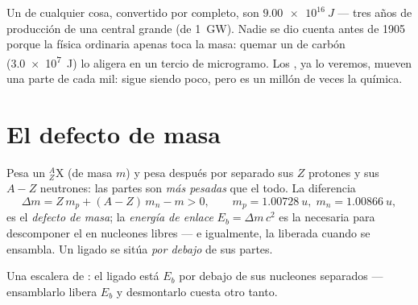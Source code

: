 \begin{example}\label{ex:g12:nuclear-energy:fortune}
Un  de cualquier cosa, convertido por completo, son $\qty{9.00e16}{J}$ ---
tres años de producción de una central grande (de \qty{1}{GW}). Nadie se dio cuenta
antes de 1905 porque la física ordinaria apenas toca la masa: quemar un  de
carbón (\qty{3.0e7}{J}) lo aligera en un tercio de microgramo. Los , ya lo
veremos, mueven una parte de cada mil: sigue siendo poco, pero es un millón de veces
la química.
\end{example}

\section{El defecto de masa}

\begin{definition}\label{def:g12:nuclear-energy:defect}
Pesa un  ${}^{A}_{Z}\mathrm{X}$ (de masa $m$) y pesa después por separado sus
$Z$ protones y sus $A - Z$ neutrones: las partes son \emph{más pesadas} que el todo.
La diferencia
\[
\Delta m = Z\,m_p + (A - Z)\,m_n - m > 0,
\qquad m_p = \qty{1.00728}{u},\; m_n = \qty{1.00866}{u},
\]
es el \emph{defecto de masa}; la \emph{energía de
enlace} $E_b = \Delta m\,c^2$ es la  necesaria para
descomponer el  en nucleones libres --- e igualmente, la  liberada cuando
se ensambla. Un  ligado se sitúa \emph{por debajo} de sus partes.
\end{definition}

\begin{omfigure}

{\small Una escalera de : el  ligado está $E_b$ por debajo de sus
nucleones separados --- ensamblarlo libera $E_b$ y desmontarlo cuesta otro tanto.}
\end{omfigure}

